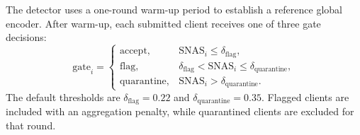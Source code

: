 \documentclass[pdflatex,sn-mathphys-num]{sn-jnl}
\begin{document}
The detector uses a one-round warm-up period to establish a reference global encoder. After warm-up, each submitted client receives one of three gate decisions:
\begin{equation}
    \mathrm{gate}_i=\begin{cases}
        \mathrm{accept}, & \mathrm{SNAS}_i\leq \delta_{\mathrm{flag}},\\
        \mathrm{flag}, & \delta_{\mathrm{flag}} < \mathrm{SNAS}_i\leq \delta_{\mathrm{quarantine}},\\
        \mathrm{quarantine}, & \mathrm{SNAS}_i > \delta_{\mathrm{quarantine}}.
    \end{cases}
\end{equation}
The default thresholds are $\delta_{\mathrm{flag}}=0.22$ and $\delta_{\mathrm{quarantine}}=0.35$. Flagged clients are included with an aggregation penalty, while quarantined clients are excluded for that round.
\end{document}
